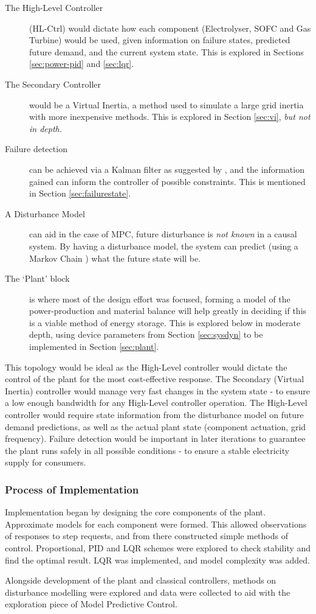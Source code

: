 \begin{description}
        \item[The High-Level Controller] (HL-Ctrl) would dictate how each component (Electrolyser, SOFC and Gas Turbine) would be used, given information on failure states, predicted future demand, and the current system state. This is explored in Sections \ref{sec:power-pid} and \ref{sec:lqr}.
        \item[The Secondary Controller] would be a Virtual Inertia, a method used to simulate a large grid inertia with more inexpensive methods. {This is explored in Section \ref{sec:vi}, \emph{but not in depth.}}
        \item[Failure detection] can be achieved via a Kalman filter as suggested by \cite{power:kalman}, and the information gained can inform the controller of possible constraints. {This is mentioned in Section \ref{sec:failurestate}.}
        \item[A Disturbance Model] can aid in the case of MPC, future disturbance is \emph{not known} in a causal system. By having a disturbance model, the system can predict (using a Markov Chain \cite{power:markovP}) what the future state will be.
        \item[The `Plant' block] is where most of the design effort was focused, forming a model of the power-production and material balance will help greatly in deciding if this is a viable method of energy storage. {This is explored below in moderate depth, using device parameters from Section \ref{sec:sysdyn} to be implemented in Section \ref{sec:plant}.}
\end{description}

This topology would be ideal as the High-Level controller would dictate the control of the plant for the most cost-effective response.
The Secondary (Virtual Inertia) controller would manage very fast changes in the system state - to ensure a low enough bandwidth for any High-Level controller operation.
The High-Level controller would require state information from the disturbance model on future demand predictions, as well as the actual plant state (component actuation, grid frequency).
Failure detection would be important in later iterations to guarantee the plant runs safely in all possible conditions - to ensure a stable electricity supply for consumers.

\subsubsection{Process of Implementation}

Implementation began by designing the core components of the plant.
Approximate models for each component were formed.
This allowed observations of responses to step requests, and from there constructed simple methods of control.
Proportional, PID and LQR schemes were explored to check stability and find the optimal result.
LQR was implemented, and model complexity was added.

Alongside development of the plant and classical controllers, methods on disturbance modelling were explored and data were collected to aid with the exploration piece of Model Predictive Control.

